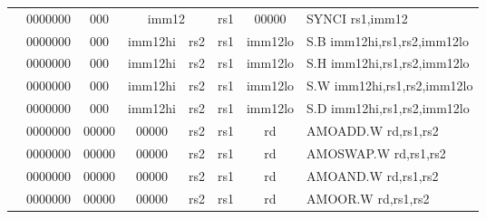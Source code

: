 \begin{table}[p]
\begin{small}
\begin{center}
\begin{tabular}{rcccccccccl}
&
\multicolumn{1}{|c|}{0000000} &
\multicolumn{2}{c|}{000} &
\multicolumn{4}{c|}{imm12} &
\multicolumn{1}{c|}{rs1} &
\multicolumn{1}{c|}{00000} & SYNCI rs1,imm12 \\
\cline{2-10}
  

&
\multicolumn{1}{|c|}{0000000} &
\multicolumn{2}{c|}{000} &
\multicolumn{3}{c|}{imm12hi} &
\multicolumn{1}{c|}{rs2} &
\multicolumn{1}{c|}{rs1} &
\multicolumn{1}{c|}{imm12lo} & S.B imm12hi,rs1,rs2,imm12lo \\
\cline{2-10}
  

&
\multicolumn{1}{|c|}{0000000} &
\multicolumn{2}{c|}{000} &
\multicolumn{3}{c|}{imm12hi} &
\multicolumn{1}{c|}{rs2} &
\multicolumn{1}{c|}{rs1} &
\multicolumn{1}{c|}{imm12lo} & S.H imm12hi,rs1,rs2,imm12lo \\
\cline{2-10}
  

&
\multicolumn{1}{|c|}{0000000} &
\multicolumn{2}{c|}{000} &
\multicolumn{3}{c|}{imm12hi} &
\multicolumn{1}{c|}{rs2} &
\multicolumn{1}{c|}{rs1} &
\multicolumn{1}{c|}{imm12lo} & S.W imm12hi,rs1,rs2,imm12lo \\
\cline{2-10}
  

&
\multicolumn{1}{|c|}{0000000} &
\multicolumn{2}{c|}{000} &
\multicolumn{3}{c|}{imm12hi} &
\multicolumn{1}{c|}{rs2} &
\multicolumn{1}{c|}{rs1} &
\multicolumn{1}{c|}{imm12lo} & S.D imm12hi,rs1,rs2,imm12lo \\
\cline{2-10}
  

&
\multicolumn{1}{|c|}{0000000} &
\multicolumn{3}{c|}{00000} &
\multicolumn{2}{c|}{00000} &
\multicolumn{1}{c|}{rs2} &
\multicolumn{1}{c|}{rs1} &
\multicolumn{1}{c|}{rd} & AMOADD.W rd,rs1,rs2 \\
\cline{2-10}
  

&
\multicolumn{1}{|c|}{0000000} &
\multicolumn{3}{c|}{00000} &
\multicolumn{2}{c|}{00000} &
\multicolumn{1}{c|}{rs2} &
\multicolumn{1}{c|}{rs1} &
\multicolumn{1}{c|}{rd} & AMOSWAP.W rd,rs1,rs2 \\
\cline{2-10}
  

&
\multicolumn{1}{|c|}{0000000} &
\multicolumn{3}{c|}{00000} &
\multicolumn{2}{c|}{00000} &
\multicolumn{1}{c|}{rs2} &
\multicolumn{1}{c|}{rs1} &
\multicolumn{1}{c|}{rd} & AMOAND.W rd,rs1,rs2 \\
\cline{2-10}
  

&
\multicolumn{1}{|c|}{0000000} &
\multicolumn{3}{c|}{00000} &
\multicolumn{2}{c|}{00000} &
\multicolumn{1}{c|}{rs2} &
\multicolumn{1}{c|}{rs1} &
\multicolumn{1}{c|}{rd} & AMOOR.W rd,rs1,rs2 \\
\cline{2-10}
  


\end{tabular}
\end{center}
\end{small}
\end{table}
